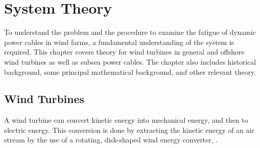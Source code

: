 \chapter{System Theory}
\label{chap:sysdes}
To understand the problem and the procedure to examine the fatigue of dynamic power cables in wind farms, a fundamental understanding of the system is required. This chapter covers theory for wind turbines in general and offshore wind turbines as well as subsea power cables. The chapter also includes historical background, some principal mathematical background, and other relevant theory. 
\section{Wind Turbines}
A wind turbine can convert kinetic energy into mechanical energy, and then to electric energy. This conversion is done by extracting the kinetic energy of an air stream by the use of a rotating, disk-shaped wind energy converter, \cite{Hau2013}.

